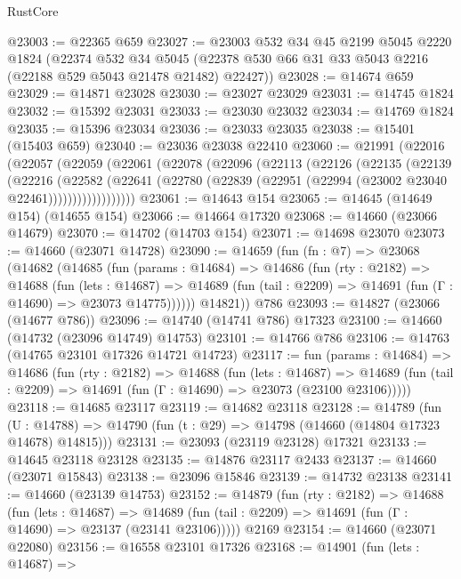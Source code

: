 \begin{lexlean}{RustCore}
\begin{coremodule}
@23003 := @22365 @659
@23027 := @23003
    @532
    @34
    @45
    @2199
    @5045
    @2220
    @1824
    (@22374
      @532
      @34
      @5045
      (@22378 @530 @66 @31 @33 @5043 @2216 (@22188 @529 @5043 @21478 @21482) @22427))
@23028 := @14674 @659
@23029 := @14871 @23028
@23030 := @23027 @23029
@23031 := @14745 @1824
@23032 := @15392 @23031
@23033 := @23030 @23032
@23034 := @14769 @1824
@23035 := @15396 @23034
@23036 := @23033 @23035
@23038 := @15401 (@15403 @659)
@23040 := @23036 @23038 @22410
@23060 := @21991
    (@22016
      (@22057
        (@22059
          (@22061
            (@22078
              (@22096
                (@22113
                  (@22126
                    (@22135
                      (@22139
                        (@22216
                          (@22582
                            (@22641
                              (@22780
                                (@22839 (@22951 (@22994 (@23002 @23040 @22461))))))))))))))))))
@23061 := @14643 @154
@23065 := @14645 (@14649 @154) (@14655 @154)
@23066 := @14664 @17320
@23068 := @14660 (@23066 @14679)
@23070 := @14702 (@14703 @154)
@23071 := @14698 @23070
@23073 := @14660 (@23071 @14728)
@23090 := @14659
    (fun (fn : @7) =>
    @23068
      (@14682
        (@14685
          (fun (params : @14684) =>
          @14686
            (fun (rty : @2182) =>
            @14688
              (fun (lets : @14687) =>
              @14689 (fun (tail : @2209) => @14691 (fun (Γ : @14690) => @23073 @14775))))))
        @14821))
    @786
@23093 := @14827 (@23066 (@14677 @786))
@23096 := @14740 (@14741 @786) @17323
@23100 := @14660 (@14732 (@23096 @14749) @14753)
@23101 := @14766 @786
@23106 := @14763 (@14765 @23101 @17326 @14721 @14723)
@23117 := fun (params : @14684) =>
  @14686
    (fun (rty : @2182) =>
    @14688
      (fun (lets : @14687) =>
      @14689 (fun (tail : @2209) => @14691 (fun (Γ : @14690) => @23073 (@23100 @23106)))))
@23118 := @14685 @23117
@23119 := @14682 @23118
@23128 := @14789
    (fun (U : @14788) => @14790 (fun (t : @29) => @14798 (@14660 (@14804 @17323 @14678) @14815)))
@23131 := @23093 (@23119 @23128) @17321
@23133 := @14645 @23118 @23128
@23135 := @14876 @23117 @2433
@23137 := @14660 (@23071 @15843)
@23138 := @23096 @15846
@23139 := @14732 @23138
@23141 := @14660 (@23139 @14753)
@23152 := @14879
    (fun (rty : @2182) =>
    @14688
      (fun (lets : @14687) =>
      @14689 (fun (tail : @2209) => @14691 (fun (Γ : @14690) => @23137 (@23141 @23106)))))
    @2169
@23154 := @14660 (@23071 @22080)
@23156 := @16558 @23101 @17326
@23168 := @14901
    (fun (lets : @14687) =>

\end{coremodule}
\end{lexlean}
